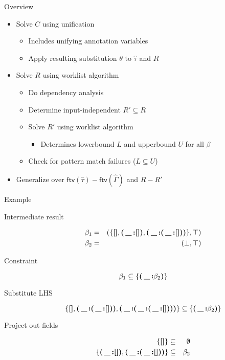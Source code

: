 \documentclass{beamer}
\newcommand{\tauhat}{\widehat{\tau}}
\newcommand{\Nill}{\textbf{[]}}
\newcommand{\Conss}[1]{\textbf{(\,\_\,:}#1\textbf{)}}
\begin{document}
\begin{frame}{Overview}
\begin{itemize}
\item Solve $C$ using unification
    \begin{itemize}
    \item Includes unifying annotation variables
    \item Apply resulting substitution $\theta$ to $\tauhat$ and $R$
    \end{itemize}
\item Solve $R$ using worklist algorithm
    \begin{itemize}
    \item Do dependency analysis
    \item Determine input-independent $R' \subseteq R$
    \item Solve $R'$ using worklist algorithm
    \begin{itemize}
        \item Determines lowerbound $L$ and upperbound $U$ for all $\beta$
    \end{itemize}
    \item Check for pattern match failures ($L \subseteq U$)
    \end{itemize}
\item Generalize over $\mathsf{ftv}(\tauhat)-\mathsf{ftv}(\widehat\Gamma)$ and $R - R'$
\end{itemize}
\end{frame}

\begin{frame}{Example}
\begin{description}
\item[Intermediate result] \begin{eqnarray*} \beta_1 &=& (\{\Nill, \Conss{\Nill}, \Conss{\Conss{\Nill}}\}, \top) \\ \beta_2 &=& (\bot, \top)\end{eqnarray*}\pause
\item[Constraint\quad\quad] \[ \beta_1 \subseteq \{\Conss{\beta_2}\} \]\pause
\item[Substitute LHS] \[ \{\Nill, \Conss{\Conss{\Nill}}, \Conss{\Conss{\Conss{\Nill}}}\} \subseteq \{\Conss{\beta_2}\} \]\pause
\item[Project out fields] \begin{eqnarray*}  \{\Nill\} &\subseteq& \emptyset \\ \{\Conss{\Nill}, \Conss{\Conss{\Nill}}\} &\subseteq& \beta_2 \end{eqnarray*}
\end{description}
\end{frame}
\end{document}
